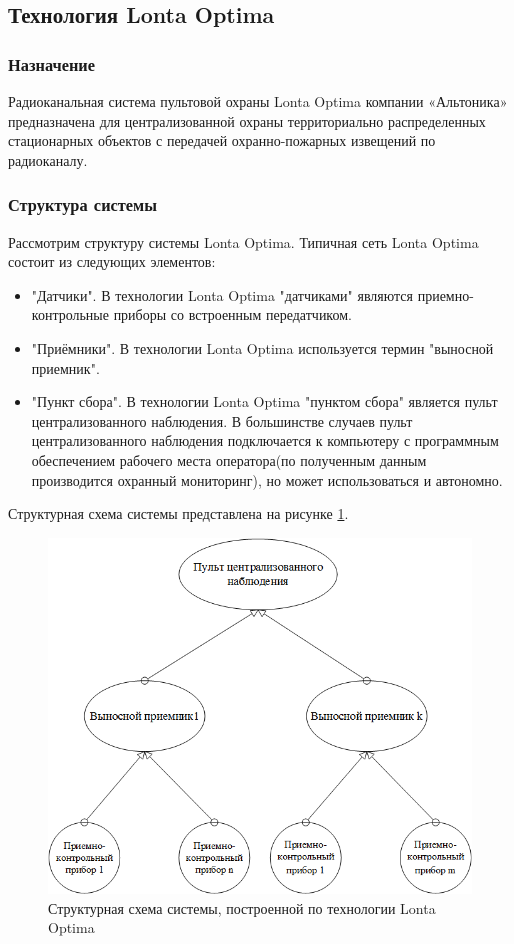 \subsection{Технология Lonta Optima}
\subsubsection{Назначение}
Радиоканальная система пультовой охраны Lonta Optima компании «Альтоника» предназначена для централизованной охраны территориально распределенных стационарных объектов с передачей охранно-пожарных извещений по радиоканалу.
\subsubsection{Структура системы}
Рассмотрим структуру системы Lonta Optima. Типичная сеть Lonta Optima состоит из следующих элементов: 
\begin{itemize}
	\item"Датчики". В технологии Lonta Optima "датчиками" являются приемно-контрольные приборы со встроенным передатчиком.  
	\item"Приёмники". В технологии  Lonta Optima используется термин "выносной приемник".
	\item"Пункт сбора". В технологии  Lonta Optima "пунктом сбора" является пульт централизованного наблюдения. В большинстве случаев пульт централизованного наблюдения подключается к компьютеру с программным обеспечением рабочего места оператора(по полученным данным производится охранный мониторинг), но может использоваться и автономно.  
\end{itemize}

Структурная схема системы представлена на рисунке
\ref{fig:Lonta_Optima}.

\begin{figure}[h]
	\centering\includegraphics[width=0.7\linewidth]{img/Lonta_Optima}
	\caption{Структурная схема системы, построенной по технологии Lonta Optima}
	\label{fig:Lonta_Optima}
\end{figure}

